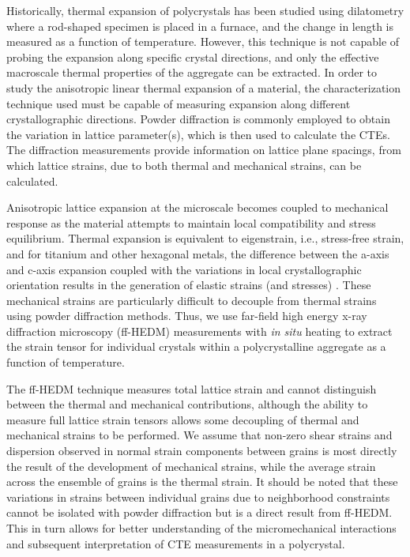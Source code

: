 \documentclass[3p]{elsarticle}
\begin{document}
	Historically, thermal expansion of polycrystals has been studied using dilatometry \cite{Roberts1962, ASMInternational2002} where a rod-shaped specimen is placed in a furnace, and the change in length is measured as a function of temperature. However, this technique is not capable of probing the expansion along specific crystal directions, and only the ef{}fective macroscale thermal properties of the aggregate can be extracted. In order to study the anisotropic linear thermal expansion of a material, the characterization technique used must be capable of measuring expansion along dif{}ferent crystallographic directions. Powder dif{}fraction \cite{Spreadborough1959, Pawar1968} is commonly employed to obtain the variation in lattice parameter(s), which is then used to calculate the CTEs. The dif{}fraction measurements provide information on lattice plane spacings, from which lattice strains, due to both thermal and mechanical strains, can be calculated.
	
	Anisotropic lattice expansion at the microscale becomes coupled to mechanical response as the material attempts to maintain local compatibility and stress equilibrium. Thermal expansion is equivalent to eigenstrain, i.e., stress-free strain, and for titanium and other hexagonal metals, the dif{}ference between the a-axis and c-axis expansion coupled with the variations in local crystallographic orientation results in the generation of elastic strains (and stresses) \cite{Boab1944}. These mechanical strains are particularly dif{}ficult to decouple from thermal strains using powder dif{}fraction methods. Thus, we use far-field high energy x-ray dif{}fraction microscopy (f{}f-HEDM) measurements with \textit{in situ} heating to extract the strain tensor for individual crystals within a polycrystalline aggregate as a function of temperature.
	
	The f{}f-HEDM technique measures total lattice strain and cannot distinguish between the thermal and mechanical contributions, although the ability to measure full lattice strain tensors allows some decoupling of thermal and mechanical strains to be performed. We assume that non-zero shear strains and dispersion observed in normal strain components between grains is most directly the result of the development of mechanical strains, while the average strain across the ensemble of grains is the thermal strain. It should be noted that these variations in strains between individual grains due to neighborhood constraints cannot be isolated with powder dif{}fraction but is a direct result from f{}f-HEDM. This in turn allows for better understanding of the micromechanical interactions and subsequent interpretation of CTE measurements in a polycrystal.
	
\end{document}
